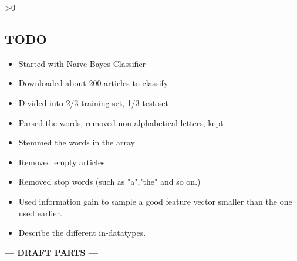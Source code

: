 \ifnum\printdraft>0
\subsection{TODO}
\begin{itemize}
\item Started with Naïve Bayes Classifier
\item Downloaded about 200 articles to classify
\item Divided into 2/3 training set, 1/3 test set
\item Parsed the words, removed non-alphabetical letters, kept -
\item Stemmed the words in the array
\item Removed empty articles
\item Removed stop words (such as "a","the" and so on.)
\item Used information gain to sample a good feature vector smaller than the one used earlier.
\item Describe the different in-datatypes.
\end{itemize}
\else
\begin{center}
\textbf{--- DRAFT PARTS ---}
\end{center}
\fi
